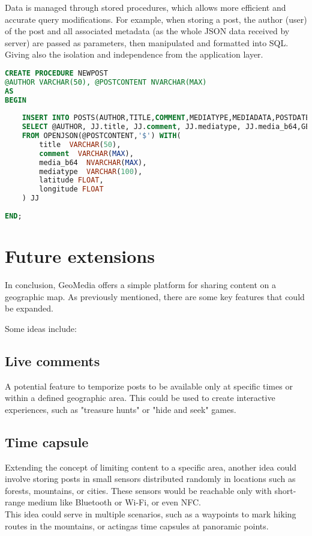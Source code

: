 \documentclass[conference]{IEEEtran}
\begin{document}
Data is managed through stored procedures, which allows more efficient and accurate query modifications. For example, when storing a post,
the author (user) of the post and all associated metadata (as the whole JSON data received by server) are passed as parameters, then manipulated and formatted into SQL. Giving also the isolation and independence from the application layer.

\begin{lstlisting}[language=SQL, description=Stored Procedure of post creation]
CREATE PROCEDURE NEWPOST
@AUTHOR VARCHAR(50), @POSTCONTENT NVARCHAR(MAX)
AS
BEGIN
	
	INSERT INTO POSTS(AUTHOR,TITLE,COMMENT,MEDIATYPE,MEDIADATA,POSTDATETIME, LATITUDE, LONGITUDE)
	SELECT @AUTHOR, JJ.title, JJ.comment, JJ.mediatype, JJ.media_b64,GETDATE(), JJ.latitude ,JJ.longitude 
	FROM OPENJSON(@POSTCONTENT,'$') WITH(
		title  VARCHAR(50),
		comment  VARCHAR(MAX),
		media_b64  NVARCHAR(MAX),
		mediatype  VARCHAR(100),
		latitude FLOAT,
		longitude FLOAT
	) JJ
	
END;

\end{lstlisting}


\section{Future extensions}

In conclusion, GeoMedia offers a simple platform for sharing content on a geographic map. As previously mentioned, there are some key features that could be expanded.

Some ideas include:

\subsection{Live comments}
A potential feature to temporize posts to be available only at specific times or within a defined geographic area.
This could be used to create interactive experiences, such as "treasure hunts" or "hide and seek" games.

\subsection{Time capsule}

Extending the concept of limiting content to a specific area, another idea could involve storing posts in small sensors distributed randomly in locations such as forests, mountains, or cities. 
These sensors would be reachable only with short-range medium like Bluetooth or Wi-Fi, or even NFC.
\\
This idea could serve in multiple scenarios, such as a waypoints to mark hiking routes in the mountains, or actingas time capsules at panoramic points.
\end{document}
